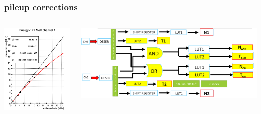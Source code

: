 \documentclass[aspectratio=169]{beamer}
\begin{document}
	\begin{frame}
		\frametitle{pileup corrections}
		\begin{columns}
			\begin{center}
				\includegraphics[width=0.5 \textwidth]{IMG2/pileup2}
			\end{center}
		\begin{center}
			\includegraphics[width=0.95 \textwidth]{IMG2/pileup3}
		\end{center}
		\end{columns}
	\end{frame}

		
	
\end{document}
